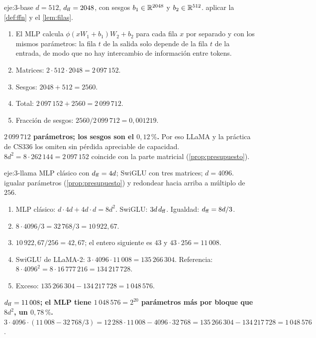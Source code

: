 \begin{solucion}{eje:3-base}
\datos $d=512$, $d_{\mathrm{ff}}=2048$, con sesgos $b_1\in\mathbb{R}^{2048}$ y $b_2\in\mathbb{R}^{512}$.
\planteamiento aplicar la \cref{def:ffn} y el \cref{lem:filas}.
\pasos
\begin{enumerate}[label=\arabic*.]
  \item El MLP calcula $\phi(xW_1+b_1)W_2+b_2$ para cada fila $x$ por separado y con los mismos parámetros: la fila $t$ de la salida solo depende de la fila $t$ de la entrada, de modo que no hay intercambio de información entre tokens.
  \item Matrices: $2\cdot 512\cdot 2048=2\,097\,152$.
  \item Sesgos: $2048+512=2560$.
  \item Total: $2\,097\,152+2560=2\,099\,712$.
  \item Fracción de sesgos: $2560/2\,099\,712=0{,}001219$.
\end{enumerate}
\resultado \textbf{$2\,099\,712$ parámetros; los sesgos son el $0{,}12\,\%$.} Por eso LLaMA y la práctica de CS336 los omiten sin pérdida apreciable de capacidad.
\comprobacion $8d^{2}=8\cdot 262\,144=2\,097\,152$ coincide con la parte matricial (\cref{prop:presupuesto}).
\end{solucion}

\begin{solucion}{eje:3-llama}
\datos MLP clásico con $d_{\mathrm{ff}}=4d$; SwiGLU con tres matrices; $d=4096$.
\planteamiento igualar parámetros (\cref{prop:presupuesto}) y redondear hacia arriba a múltiplo de $256$.
\pasos
\begin{enumerate}[label=\arabic*.]
  \item MLP clásico: $d\cdot 4d+4d\cdot d=8d^{2}$. SwiGLU: $3d\,d_{\mathrm{ff}}$. Igualdad: $d_{\mathrm{ff}}=8d/3$.
  \item $8\cdot 4096/3=32\,768/3=10\,922{,}67$.
  \item $10\,922{,}67/256=42{,}67$; el entero siguiente es $43$ y $43\cdot 256=11\,008$.
  \item SwiGLU de LLaMA-2: $3\cdot 4096\cdot 11\,008=135\,266\,304$. Referencia: $8\cdot 4096^{2}=8\cdot 16\,777\,216=134\,217\,728$.
  \item Exceso: $135\,266\,304-134\,217\,728=1\,048\,576$.
\end{enumerate}
\resultado \textbf{$d_{\mathrm{ff}}=11\,008$; el MLP tiene $1\,048\,576=2^{20}$ parámetros más por bloque que $8d^{2}$, un $0{,}78\,\%$.}
\comprobacion $3\cdot 4096\cdot(11\,008-32\,768/3)=12\,288\cdot 11\,008-4096\cdot 32\,768=135\,266\,304-134\,217\,728=1\,048\,576$.
\end{solucion}

